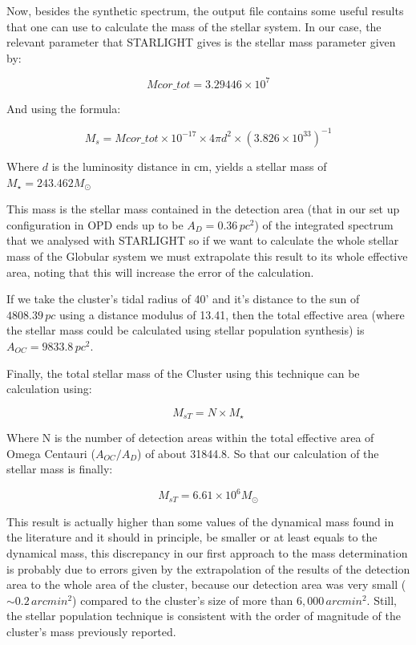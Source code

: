 Now, besides the synthetic spectrum, the output file contains some useful results that one can use to calculate the mass of the stellar system. In our case, the relevant parameter that STARLIGHT gives is the stellar mass parameter given by:

\begin{equation}
Mcor\_tot = 3.29446 \times 10^{7}
\end{equation}

And using the formula:

\begin{equation}
M_{s}=Mcor\_tot\times10^{-17}\times4\pi d^{2}\times\left(3.826\times10^{33}\right)^{-1}
\end{equation}

Where $d$ is the luminosity distance in cm, yields a stellar mass of $M_{\star}=243.462M_{\odot}$

This mass is the stellar mass contained in the detection area (that in our set up configuration in OPD ends up to be $A_{D}=0.36\,pc^{2}$) of the integrated spectrum that we analysed with STARLIGHT so if we want to calculate the whole stellar mass of the Globular system we must extrapolate this result to its whole effective area, noting that this will increase the error of the calculation.

If we take the cluster's tidal radius of 40' and it's distance to the sun of $4808.39\,pc$ using a distance modulus of 13.41, then the total effective area (where the stellar mass could be calculated using stellar population synthesis) is $A_{OC}=9833.8\,pc^{2}$. 

Finally, the total stellar mass of the Cluster using this technique can be calculation using:

\begin{equation}
M_{s T} = N \times M_{\star}
\end{equation}

Where N is the number of detection areas within the total effective area of Omega Centauri ($A_{OC}/A_{D}$) of about 31844.8. So that our calculation of the stellar mass is finally:

\begin{equation}
M_{s T} = 6.61 \times 10^{6}M_{\odot}
\end{equation}
 
This result is actually higher than some values  of the dynamical mass found in the literature and it should in principle, be smaller or at least equals to the dynamical mass, this discrepancy in our first approach to the mass determination is probably due to errors given by the extrapolation of the results of the detection area to the whole area of the cluster, because our detection area was very small ($\sim 0.2 \, arcmin^{2}$) compared to the cluster's size of more than $6,000 \, arcmin^{2}$. Still, the stellar population technique is consistent with the order of magnitude of the cluster's mass previously reported.  

